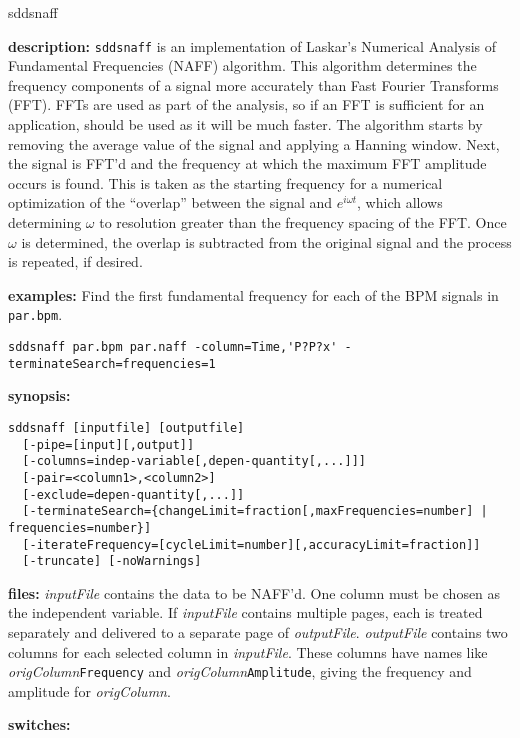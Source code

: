 \begin{sddsprog}{sddsnaff}
  \item \textbf{description:}
    \verb|sddsnaff| is an implementation of Laskar's Numerical Analysis of Fundamental
    Frequencies (NAFF) algorithm. This algorithm determines the frequency components
    of a signal more accurately than Fast Fourier Transforms (FFT). FFTs are used as
    part of the analysis, so if an FFT is sufficient for an application, 
    should be used as it will be much faster.
    The algorithm starts by removing the average value of the signal and applying a
    Hanning window. Next, the signal is FFT'd and the frequency at which the maximum
    FFT amplitude occurs is found. This is taken as the starting frequency for a
    numerical optimization of the ``overlap'' between the signal and $e^{i\omega t}$,
    which allows determining $\omega$ to resolution greater than the frequency spacing
    of the FFT. Once $\omega$ is determined, the overlap is subtracted from the
    original signal and the process is repeated, if desired.
  \item \textbf{examples:}
    Find the first fundamental frequency for each of the BPM signals in \verb|par.bpm|.
    \begin{verbatim}
sddsnaff par.bpm par.naff -column=Time,'P?P?x' -terminateSearch=frequencies=1
    \end{verbatim}
  \item \textbf{synopsis:}
    \begin{verbatim}
sddsnaff [inputfile] [outputfile]
  [-pipe=[input][,output]]
  [-columns=indep-variable[,depen-quantity[,...]]]
  [-pair=<column1>,<column2>]
  [-exclude=depen-quantity[,...]]
  [-terminateSearch={changeLimit=fraction[,maxFrequencies=number] | frequencies=number}]
  [-iterateFrequency=[cycleLimit=number][,accuracyLimit=fraction]]
  [-truncate] [-noWarnings]
    \end{verbatim}
  \item \textbf{files:}
    \emph{inputFile} contains the data to be NAFF'd. One column must be chosen as the
    independent variable. If \emph{inputFile} contains multiple pages, each is treated
    separately and delivered to a separate page of \emph{outputFile}.
    \emph{outputFile} contains two columns for each selected column in \emph{inputFile}.
    These columns have names like \emph{origColumn}\verb|Frequency| and
    \emph{origColumn}\verb|Amplitude|, giving the frequency and amplitude for
    \emph{origColumn}.
  \item \textbf{switches:}

\end{sddsprog}
